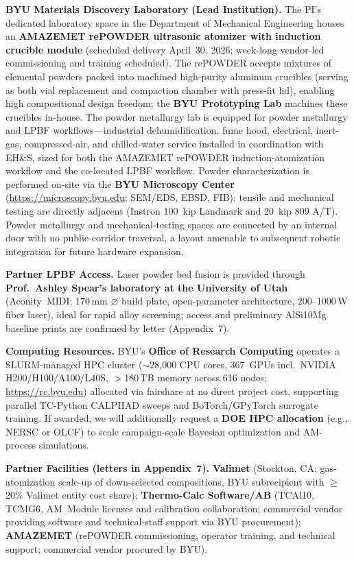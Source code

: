 \documentclass[11pt,letterpaper]{article}
\begin{document}
\textbf{BYU Materials Discovery Laboratory (Lead Institution).}
The PI's dedicated laboratory space in the Department of Mechanical Engineering
houses an \textbf{AMAZEMET rePOWDER ultrasonic atomizer with induction
crucible module} (scheduled delivery April~30, 2026; week-long
vendor-led commissioning and training scheduled).  The rePOWDER accepts
mixtures of elemental powders packed into machined high-purity aluminum
crucibles (serving as both vial replacement and compaction chamber with
press-fit lid), enabling high compositional design freedom; the
\textbf{BYU Prototyping Lab} machines these crucibles in-house.  The
powder metallurgy lab is equipped for powder metallurgy and LPBF
workflows---industrial dehumidification, fume hood, electrical, inert-gas,
compressed-air, and chilled-water service installed in coordination with
EH\&S, sized for both the AMAZEMET rePOWDER induction-atomization workflow
and the co-located LPBF workflow.  Powder characterization
is performed on-site via the \textbf{BYU Microscopy Center}
(\url{https://microscopy.byu.edu}; SEM/EDS, EBSD, FIB); tensile and
mechanical testing are directly adjacent (Instron 100~kip Landmark and
20~kip 809 A/T).  Powder metallurgy and mechanical-testing spaces are
connected by an internal door with no public-corridor traversal, a
layout amenable to subsequent robotic integration for future hardware
expansion.

\textbf{Partner LPBF Access.}
Laser powder bed fusion is provided through \textbf{Prof.\ Ashley Spear's
laboratory at the University of Utah} (Aconity~MIDI; 170\,mm $\varnothing$
build plate, open-parameter architecture, 200--1000\,W fiber laser), ideal
for rapid alloy screening; access and preliminary AlSi10Mg baseline prints
are confirmed by letter (Appendix~7).

\textbf{Computing Resources.}
BYU's \textbf{Office of Research Computing} operates a SLURM-managed HPC
cluster ($\sim$28{,}000 CPU cores, 367~GPUs incl.\ NVIDIA H200/H100/A100/L40S,
$>$180\,TB memory across 616 nodes; \url{https://rc.byu.edu}) allocated via
fairshare at no direct project cost, supporting parallel TC-Python CALPHAD
sweeps and BoTorch/GPyTorch surrogate training.  If awarded, we will
additionally request a \textbf{DOE HPC allocation} (e.g., NERSC or OLCF) to
scale campaign-scale Bayesian optimization and AM-process simulations.

\textbf{Partner Facilities (letters in Appendix~7).}
\textbf{Valimet} (Stockton, CA; gas-atomization scale-up of down-selected
compositions, BYU subrecipient with $\geq$20\% Valimet entity cost share);
\textbf{Thermo-Calc Software/AB} (TCAl10, TCMG6, AM~Module licenses and
calibration collaboration; commercial vendor providing software and
technical-staff support via BYU procurement);
\textbf{AMAZEMET} (rePOWDER commissioning, operator training, and technical
support; commercial vendor procured by BYU).
\end{document}
